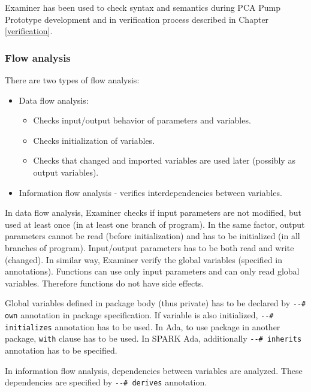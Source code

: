 Examiner has been used to check syntax and semantics during PCA Pump Prototype development and in verification process described in Chapter \ref{verification}.


\subsubsection{Flow analysis}
\label{background:sparkverification:examiner:flowanalysis}
There are two types of flow analysis:
\begin{itemize} \itemsep1pt \parskip0pt 
	\item Data flow analysis:
	\begin{itemize} \itemsep1pt \parskip0pt 
		\item Checks input/output behavior of parameters and variables.
		\item Checks initialization of variables.
		\item Checks that changed and imported variables are used later (possibly as output variables).
	\end{itemize}
	\item Information flow analysis - verifies interdependencies between variables.
\end{itemize}

In data flow analysis, Examiner checks if input parameters are not modified, but used at least once (in at least one branch of program). In the same factor, output parameters cannot be read (before initialization) and has to be initialized (in all branches of program). Input/output parameters has to be both read and write (changed). In similar way, Examiner verify the global variables (specified in annotations). Functions can use only input parameters and can only read global variables. Therefore functions do not have side effects. 

Global variables defined in package body (thus private) has to be declared by \lstinline{--# own} annotation in package specification. If variable is also initialized, \lstinline{--# initializes} annotation has to be used. In Ada, to use package in another package, \lstinline{with} clause has to be used. In SPARK Ada, additionally \lstinline{--# inherits} annotation has to be specified.

In information flow analysis, dependencies between variables are analyzed. These dependencies are specified by \lstinline{--# derives} annotation.


